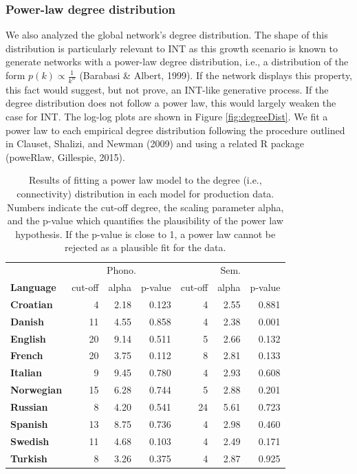 \documentclass[english,floatsintext,man]{apa6}
\theoremstyle{definition}
\theoremstyle{definition}
\theoremstyle{definition}
\theoremstyle{remark}
\begin{document}
\subsubsection{Power-law degree
distribution}\label{power-law-degree-distribution}

We also analyzed the global network's degree distribution. The shape of
this distribution is particularly relevant to INT as this growth
scenario is known to generate networks with a power-law degree
distribution, i.e., a distribution of the form
\(p(k) \propto \frac{1}{k^{\alpha}}\) (Barabasi \& Albert, 1999). If the
network displays this property, this fact would suggest, but not prove,
an INT-like generative process. If the degree distribution does not
follow a power law, this would largely weaken the case for INT. The
log-log plots are shown in Figure \ref{fig:degreeDist}. We fit a power
law to each empirical degree distribution following the procedure
outlined in Clauset, Shalizi, and Newman (2009) and using a related R
package (poweRlaw, Gillespie, 2015).

\begin{table}

\caption{\label{tab:powerLawProd}Results of fitting a power law model to the degree (i.e., connectivity) distribution in each model for production data. Numbers indicate the cut-off degree, the scaling parameter alpha, and the p-value which quantifies the plausibility of the power law hypothesis. If the p-value is close to 1, a power law cannot be rejected as a plausible fit for the data.}
\centering
\begin{tabular}[t]{>{\bfseries}lrrrrrr}
\toprule
\multicolumn{1}{c}{} & \multicolumn{3}{c}{Phono.} & \multicolumn{3}{c}{Sem.} \\
\cmidrule(l{2pt}r{2pt}){2-4} \cmidrule(l{2pt}r{2pt}){5-7}
Language & cut-off & alpha & p-value & cut-off & alpha & p-value\\
\midrule
Croatian & 4 & 2.18 & 0.123 & 4 & 2.55 & 0.881\\
Danish & 11 & 4.55 & 0.858 & 4 & 2.38 & 0.001\\
English & 20 & 9.14 & 0.511 & 5 & 2.66 & 0.132\\
French & 20 & 3.75 & 0.112 & 8 & 2.81 & 0.133\\
Italian & 9 & 9.45 & 0.780 & 4 & 2.93 & 0.608\\
Norwegian & 15 & 6.28 & 0.744 & 5 & 2.88 & 0.201\\
Russian & 8 & 4.20 & 0.541 & 24 & 5.61 & 0.723\\
Spanish & 13 & 8.75 & 0.736 & 4 & 2.98 & 0.460\\
Swedish & 11 & 4.68 & 0.103 & 4 & 2.49 & 0.171\\
Turkish & 8 & 3.26 & 0.375 & 4 & 2.87 & 0.925\\
\bottomrule
\end{tabular}
\end{table}
\end{document}
